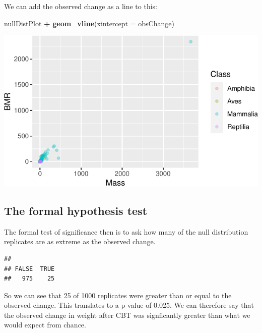 \documentclass[
  a4paperpaper,
]{book}
\newenvironment{Shaded}{\begin{snugshade}}{\end{snugshade}}
\newcommand{\DataTypeTok}[1]{\textcolor[rgb]{0.13,0.29,0.53}{#1}}
\newcommand{\KeywordTok}[1]{\textcolor[rgb]{0.13,0.29,0.53}{\textbf{#1}}}
\newcommand{\NormalTok}[1]{#1}
\newcommand{\OperatorTok}[1]{\textcolor[rgb]{0.81,0.36,0.00}{\textbf{#1}}}
\newcommand{\StringTok}[1]{\textcolor[rgb]{0.31,0.60,0.02}{#1}}
\begin{document}
We can add the observed change as a line to this:

\begin{Shaded}
\begin{Highlighting}[]
\NormalTok{nullDistPlot }\OperatorTok{+}\StringTok{ }\KeywordTok{geom\_vline}\NormalTok{(}\DataTypeTok{xintercept =}\NormalTok{ obsChange)}
\end{Highlighting}
\end{Shaded}

\includegraphics{BB852_files/figure-latex/unnamed-chunk-159-1.pdf}

\hypertarget{the-formal-hypothesis-test}{%
\subsection{The formal hypothesis test}\label{the-formal-hypothesis-test}}

The formal test of significance then is to ask how many of the null distribution replicates are as extreme as the observed change.

\begin{Shaded}
\end{Shaded}

\begin{verbatim}
## 
## FALSE  TRUE 
##   975    25
\end{verbatim}

So we can see that 25 of 1000 replicates were greater than or equal to the observed change. This translates to a p-value of 0.025. We can therefore say that the observed change in weight after CBT was signficantly greater than what we would expect from chance.
\end{document}
